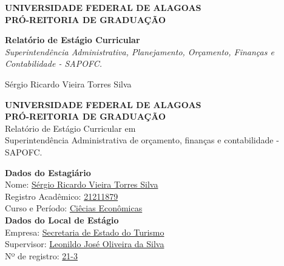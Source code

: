 \documentclass[12pt,a4paper]{article}
\begin{document}
	
	\begin{titlepage}
		\centering
		\large
		\textbf{UNIVERSIDADE FEDERAL DE ALAGOAS} \\
		\textbf{PRÓ-REITORIA DE GRADUAÇÃO} \\
		\vfill
		
		\Huge \textbf{Relatório de Estágio Curricular} \\
		\vspace{0.5cm}
		\LARGE \textit{Superintendência Administrativa, Planejamento, Orçamento, Finanças e Contabilidade - SAPOFC.} \\
		\vfill
		
		\Large Sérgio Ricardo Vieira Torres Silva \\
		\vspace{1.5cm}
	\end{titlepage}
	
	\thispagestyle{empty}
	\begin{center}
		\textbf{UNIVERSIDADE FEDERAL DE ALAGOAS} \\
		\textbf{PRÓ-REITORIA DE GRADUAÇÃO}\\
		\vspace{1cm}
		{Relatório de Estágio Curricular em}\\
		{Superintendência Administrativa de orçamento, finanças e contabilidade - SAPOFC.}
	\end{center}
	
	\vspace{1cm}
	
	\noindent \textbf{Dados do Estagiário} \\
	Nome: \underline{Sérgio Ricardo Vieira Torres Silva\hspace{0,2cm}} \\
	Registro Acadêmico: \underline{21211879\hspace{0,2cm}} \\
	Curso e Período: \underline{Ciêcias Econômicas\hspace{0,2cm}} \\
	
	\vspace{0.5cm}
	\noindent \textbf{Dados do Local de Estágio} \\
	Empresa: \underline{Secretaria de Estado do Turismo\hspace{0,2cm}} \\
	Supervisor: \underline{Leonildo José Oliveira da Silva\hspace{0,2cm}} \\
	Nº de registro: \underline{21-3\hspace{0,2cm}} \\
	
\end{document}
